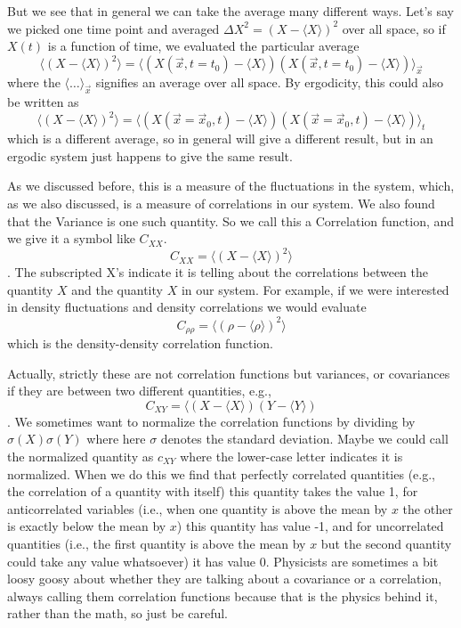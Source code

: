 \documentclass[]{revtex4}
\newcommand{\sm}[1]{{\[#1\]}}
\begin{document}
But we see that in general we can take the average many different ways.  Let's say we picked one time point and averaged
$\Delta X^2 = (X-\langle X\rangle)^2$ over all space, so if $X(t)$ is a function of time, we evaluated the particular average
\sm{\langle (X - \langle X\rangle)^2\rangle=\langle (X(\vec{x},t=t_0) - \langle X\rangle)(X(\vec{x},t=t_0) - \langle X\rangle)\rangle_\vec{x}}
where the $\langle \ldots \rangle_\vec{x}$ signifies an average over all space.  By ergodicity, this could also be written as
\sm{\langle (X - \langle X\rangle)^2\rangle=\langle (X(\vec{x}=\vec{x}_0,t) - \langle X\rangle)(X(\vec{x}=\vec{x}_0,t) - \langle X\rangle)\rangle_t}
which is a different average, so in general will give a different result, but in an ergodic system just happens to give the same result.

As we discussed before, this is a measure of the fluctuations in the system, which, as we also discussed, is a measure of correlations in our
system.  We also found that the Variance is one such quantity. So we call this a Correlation function, and we give it a symbol like $C_{XX}$.
\sm{C_{XX}=\langle (X-\langle X\rangle)^2\rangle}.
The subscripted X's indicate it is telling about the correlations between the quantity $X$ and the quantity $X$ in our system. For example,
if we were interested in density fluctuations and density correlations we would evaluate
\sm{C_{\rho\rho}=\langle (\rho-\langle \rho\rangle)^2\rangle}
which is the density-density correlation function.

Actually, strictly these are not correlation functions but variances, or covariances if they are between two different quantities, e.g.,
\sm{C_{XY}=\langle (X-\langle X\rangle)(Y-\langle Y\rangle)} .
We sometimes want to normalize the correlation functions by dividing by $\sigma(X)\sigma(Y)$ where here $\sigma$
denotes the standard deviation.  Maybe we could call the
normalized quantity as $c_{XY}$ where the lower-case letter indicates it is normalized.
When we do this we find that perfectly correlated quantities (e.g., the correlation of a quantity with itself) this quantity takes the value 1,
for anticorrelated variables (i.e., when one quantity is above the mean by $x$ the other is exactly below the mean by $x$) this quantity
has value -1, and for uncorrelated quantities (i.e., the first quantity is above the mean by $x$ but the second quantity could take any value whatsoever)
it has value 0.  Physicists are sometimes a bit loosy goosy about whether they are talking about a covariance or a correlation, always calling them
correlation functions because that is the physics behind it, rather than the math, so just be careful.
\end{document}
